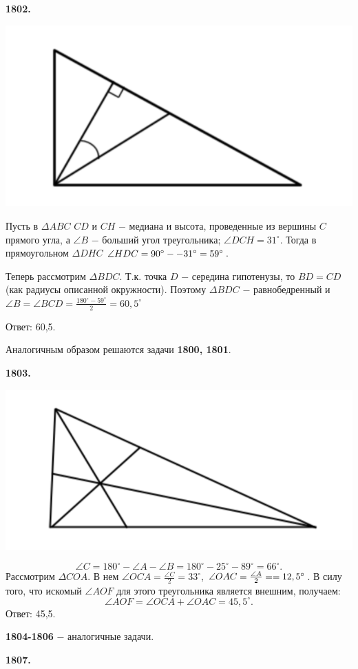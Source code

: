 \textbf{1802.}

{\centering \includegraphics[width=0.5\linewidth]{Geometry/Content/13.png}
	
}

Пусть в $\Delta ABC$ $CD$ и $CH$ $-$ медиана и высота, проведенные из вершины $C$ прямого угла, а $\angle B$ $-$ больший угол треугольника; $\angle DCH = 31^\circ$. Тогда в прямоугольном $\Delta DHC$ $\angle HDC = 90^\circ - \linebreak -31^\circ = 59^\circ$. 

Теперь рассмотрим $\Delta BDC$. Т.к. точка $D$ $-$ середина гипотенузы, то $BD = CD$ (как радиусы описанной окружности). Поэтому $\Delta BDC$ $-$ равнобедренный и $\angle B = \angle BCD = \frac{180^\circ - 59^\circ}{2} = 60,5^\circ$

 \null \hspace*{\fill} Ответ: 60,5.

Аналогичным образом решаются задачи \textbf{1800, 1801}. 

\textbf{1803.}

{\centering \includegraphics[width=0.5\linewidth]{Geometry/Content/14.png}
	
}
\[
\angle C = 180^\circ - \angle A - \angle B = 180^\circ - 25^\circ - 89^\circ = 66^\circ.
\]
 Рассмотрим $\Delta COA$. В нем $\angle OCA = \frac{\angle C}{2} = 33^\circ$, $\angle OAC = \frac{\angle A}{2} = \linebreak = 12,5^\circ$. В силу того, что искомый $\angle AOF$ для этого треугольника является внешним, получаем:
\[
\angle AOF = \angle OCA + \angle OAC = 45,5^\circ.
\] \null \hspace*{\fill} Ответ: 45,5. 

\textbf{1804-1806} $-$ аналогичные задачи.

\textbf{1807.}

